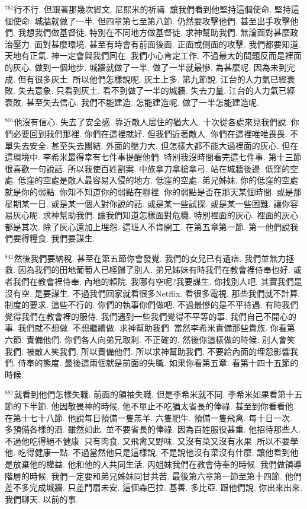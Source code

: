 \documentclass{book}
\begin{document}
$^{761}$行不行.
但跟著那幾次經文.
尼熙米的祈禱.
讓我們看到他堅持這個使命.
堅持這個使命.
城牆就做了一半.
但四章第七至第八節.
仍然要攻擊他們.
甚至出手攻擊他們.
我想我們做基督徒.
特別在不同地方做基督徒.
求神幫助我們.
無論面對甚麼政治壓力.
面對甚麼環境.
甚至有時會有前面後面.
正面或側面的攻擊.
我們都要知道.
天地有正氣.
神一定會與我們同在.
我們小心肯定工作.
不過最大的問題反而是裡面的灰心.
做到一個地步.
城牆就做了一半.
做了一半就最慘.
為甚麼呢.
因為未到完成.
但有很多灰土.
所以他們怎樣說呢.
灰土上多.
第九節說.
江台的人力氣已經衰敗.
失去意象.
只看到灰土.
看不到做了一半的城牆.
失去力量.
江台的人力氣已經衰敗.
甚至失去信心.
我們不能建造.
怎能建造呢.
做了一半怎能建造呢.

$^{801}$他沒有信心.
失去了安全感.
靠近敵人居住的猶大人.
十次從各處來見我們說.
你們必要回到我們那裡.
你們在這裡就好.
但我們近著敵人.
你們在這裡唯唯畏畏.
不單失去安全.
甚至失去團結.
外面的壓力大.
但怎樣大都不能大過裡面的灰心.
但在這環境中.
李希米最得幸有七件事提醒他們.
特別我沒時間看完這七件事.
第十三節很喜歡一句說話.
所以我使百姓割案.
中族拿刀拿槍拿弓.
站在城牆後邊.
低窪的空處.
低窪的空處是敵人最容易入侵的地方.
低窪的空處.
弟兄姊妹.
你的低窪的空處就是你的弱點.
你知不知道你的弱點在哪裡.
你的弱點是否在那天某個時間.
或是那星期某一日.
或是某一個人對你說的話.
或是某一些試探.
或是某一些困難.
讓你容易灰心呢.
求神幫助我們.
讓我們知道怎樣面對危機.
特別裡面的灰心.
裡面的灰心都是其次.
除了灰心還加上埋怨.
這班人不肯開工.
在第五章第一節.
第一他們說我們要得糧食.
我們要謀生.

$^{841}$然後我們要納稅.
甚至在第五節你會發覺.
我們的女兒已有遺痞.
我們並無力拯救.
因為我們的田地葡萄人已經歸了別人.
弟兄姊妹有時我們在教會裡侍奉也好.
或者我們在教會裡侍奉.
內地的賴院.
我哪有空呢?我要謀生.
你找別人吧.
其實我們是沒有空.
是要謀生.
不過我們回家就看很多Netflix.
看很多電視.
那些我們就不計算.
制度的要求.
這些不行的.
你們的執事你們做吧.
不過最慘的是不平待遇.
有時我們覺得我們在教會裡的服侍.
我們遇到一些我們覺得不平等的事.
我們自己不開心的事.
我們就不想做.
不想繼續做.
求神幫助我們.
當然李希米責備那些貴族.
你看第六節.
責備他們.
你們各人向弟兄取利.
不正確的.
然後你這樣做的時候.
別人會笑我們.
被敵人笑我們.
所以責備他們.
所以求神幫助我們.
不要給內面的埋怨影響我們.
侍奉的態度.
最後這兩個就是前面的失職.
如果你看第五章.
看第十四十五節的時候.

$^{881}$就看到他們怎樣失職.
前面的領袖失職.
但是李希米就不同.
李希米如果看第十五節的下半節.
他因敬畏神的時候.
他不單止不吃猶太省長的俸祿.
甚至到你看看他.
在第十七十八節.
他說每日預備一隻羔羊.
六隻肥牛.
預備一隻飛禽.
每十日一次.
多預備各樣的酒.
雖然如此.
並不要省長的俸祿.
因為百姓服役甚重.
他招待那些人.
不過他吃得絕不健康.
只有肉食.
又飛禽又野味.
又沒有菜又沒有水果.
所以不要學他.
吃得健康一點.
不過當然他只是這樣說.
不是說他沒有菜沒有什麼.
讓他看到他是放棄他的權益.
他和他的人共同生活.
丙姐妹我們在教會侍奉的時候.
我們做領導階層的時候.
我們一定要和弟兄姊妹同甘共苦.
最後第六章第一節至第十四節.
他們差不多完成城牆.
只差門扇未安.
這個森巴拉.
基善.
多比亞.
跟他們說.
你出來出來.
我們聊天.
以前的事.
\end{document}
